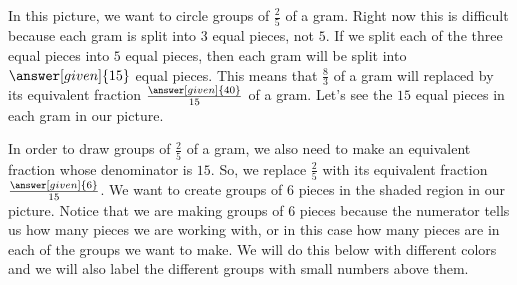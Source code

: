\documentclass{ximera}
\begin{document}
\begin{example}
\begin{image}
\end{image}
In this picture, we want to circle groups of $\frac{2}{5}$ of a gram. Right now this is difficult because each gram is split into $3$ equal pieces, not $5$. If we split each of the three equal pieces into $5$ equal pieces, then each gram will be split into $\answer[given]{15}$ equal pieces. This means that $\frac{8}{3}$ of a gram will replaced by its equivalent fraction $\frac{\answer[given]{40}}{15}$ of a gram. Let's see the $15$ equal pieces in each gram in our picture.  
\begin{image}
\end{image}
In order to draw groups of $\frac{2}{5}$ of a gram, we also need to make an equivalent 
fraction whose denominator is $15$. So, we replace $\frac{2}{5}$ with its equivalent 
fraction $\frac{\answer[given]{6}}{15}$. We want to create groups of $6$ pieces in the 
shaded region in our picture.  Notice that we are making groups of $6$ pieces because 
the numerator tells us how many pieces we are working with, or in this case how many 
pieces are in each of the groups we want to make. We will do this below with different colors and we will also label the different groups with small numbers above them.


\end{example}
\end{document}

